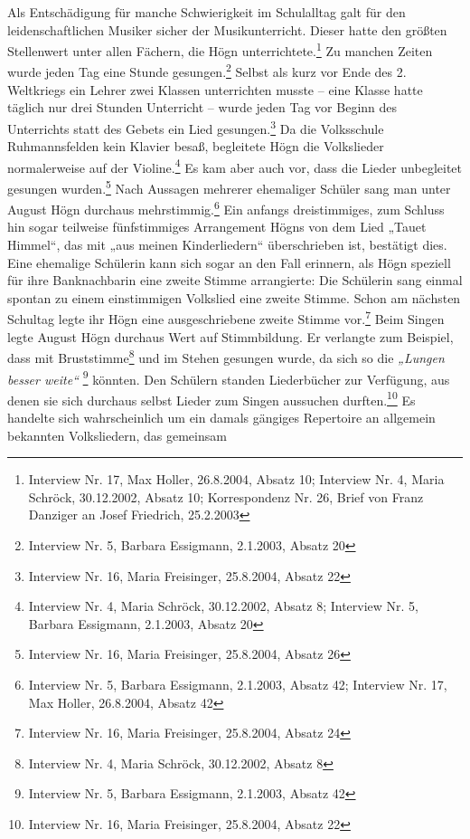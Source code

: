 \documentclass[a4paper]{article}
\newcommand\textstyleZitate[1]{\textit{#1}}
\newcommand\textstyleFootnoteSymbol[1]{\textsuperscript{#1}}
\begin{document}
Als Entschädigung für manche Schwierigkeit im Schulalltag galt für den
leidenschaftlichen Musiker sicher der Musikunterricht. Dieser hatte den
größten Stellenwert unter allen Fächern, die Högn
unterrichtete.\footnote{ Interview Nr. 17, Max Holler, 26.8.2004,
Absatz 10; Interview Nr. 4, Maria Schröck, 30.12.2002, Absatz 10;
Korrespondenz Nr. 26, Brief von Franz Danziger an Josef Friedrich,
25.2.2003} Zu manchen Zeiten wurde jeden Tag eine Stunde
gesungen.\footnote{ Interview Nr. 5, Barbara Essigmann, 2.1.2003,
Absatz 20} Selbst als kurz vor Ende des 2. Weltkriegs ein Lehrer zwei
Klassen unterrichten musste – eine Klasse hatte täglich nur drei
Stunden Unterricht – wurde jeden Tag vor Beginn des Unterrichts statt
des Gebets ein Lied gesungen.\footnote{ Interview Nr. 16, Maria
Freisinger, 25.8.2004, Absatz 22} Da die Volksschule Ruhmannsfelden
kein Klavier besaß, begleitete Högn die Volkslieder normalerweise auf
der Violine.\footnote{ Interview Nr. 4, Maria Schröck, 30.12.2002,
Absatz 8; Interview Nr. 5, Barbara Essigmann, 2.1.2003, Absatz 20} Es
kam aber auch vor, dass die Lieder unbegleitet gesungen
wurden.\footnote{ Interview Nr. 16, Maria Freisinger, 25.8.2004, Absatz
26} Nach Aussagen mehrerer ehemaliger Schüler sang man unter August
Högn durchaus mehrstimmig.\footnote{ Interview Nr. 5, Barbara
Essigmann, 2.1.2003, Absatz 42; Interview Nr. 17, Max Holler,
26.8.2004, Absatz 42} Ein anfangs dreistimmiges, zum Schluss hin sogar
teilweise fünfstimmiges Arrangement Högns von dem Lied „Tauet Himmel“,
das mit „aus meinen Kinderliedern“ überschrieben ist, bestätigt dies.
Eine ehemalige Schülerin kann sich sogar an den Fall erinnern, als Högn
speziell für ihre Banknachbarin eine zweite Stimme arrangierte: Die
Schülerin sang einmal spontan zu einem einstimmigen Volkslied eine
zweite Stimme. Schon am nächsten Schultag legte ihr Högn eine
ausgeschriebene zweite Stimme vor.\footnote{ Interview Nr. 16, Maria
Freisinger, 25.8.2004, Absatz 24} Beim Singen legte August Högn
durchaus Wert auf Stimmbildung. Er verlangte zum Beispiel, dass mit
Bruststimme\footnote{ Interview Nr. 4, Maria Schröck, 30.12.2002,
Absatz 8} und im Stehen gesungen wurde, da sich so die
\textstyleZitate{„Lungen besser weite“}\textstyleFootnoteSymbol{
}\footnote{ Interview Nr. 5, Barbara Essigmann, 2.1.2003, Absatz
42}\textstyleZitate{ }könnten. Den Schülern standen Liederbücher zur
Verfügung, aus denen sie sich durchaus selbst Lieder zum Singen
aussuchen durften.\footnote{ Interview Nr. 16, Maria Freisinger,
25.8.2004, Absatz 22} Es handelte sich wahrscheinlich um ein damals
gängiges Repertoire an allgemein bekannten Volksliedern, das gemeinsam
\end{document}
